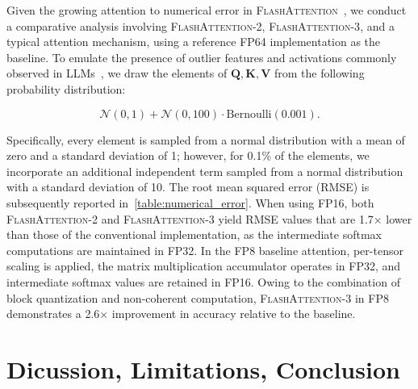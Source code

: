 Given the growing attention to numerical error in \textsc{FlashAttention}~\citep{golden2024flash}, we conduct a comparative analysis involving \textsc{FlashAttention-2}, \textsc{FlashAttention-3}, and a typical attention mechanism, using a reference FP64 implementation as the baseline. To emulate the presence of outlier features and activations commonly observed in LLMs~\citep{dettmers2208llm, sun2024massive}, we draw the elements of $\mathbf{Q}, \mathbf{K}, \mathbf{V}$ from the following probability distribution:

\begin{equation*}
  \mathcal{N}(0, 1) + \mathcal{N}(0, 100) \cdot \mathrm{Bernoulli}(0.001).
\end{equation*}

Specifically, every element is sampled from a normal distribution with a mean of zero and a standard deviation of 1; however, for 0.1\% of the elements, we incorporate an additional independent term sampled from a normal distribution with a standard deviation of 10. The root mean squared error (RMSE) is subsequently reported in~\cref{table:numerical_error}. When using FP16, both \textsc{FlashAttention-2} and \textsc{FlashAttention-3} yield RMSE values that are 1.7$\times$ lower than those of the conventional implementation, as the intermediate softmax computations are maintained in FP32. In the FP8 baseline attention, per-tensor scaling is applied, the matrix multiplication accumulator operates in FP32, and intermediate softmax values are retained in FP16. Owing to the combination of block quantization and non-coherent computation, \textsc{FlashAttention-3} in FP8 demonstrates a 2.6$\times$ improvement in accuracy relative to the baseline.

\section{Dicussion, Limitations, Conclusion}
\label{sec:discussion}

